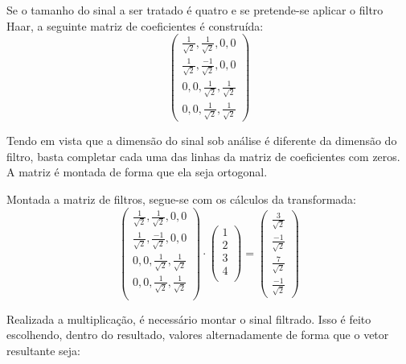 			\par Se o tamanho do sinal a ser tratado é quatro e se pretende-se aplicar o filtro Haar, a seguinte matriz de coeficientes é construída:
			\begin{equation}
				\begin{pmatrix}
					\frac{1}{\sqrt{2}}, \frac{1}{\sqrt{2}}, 0, 0\\
					\frac{1}{\sqrt{2}}, \frac{-1}{\sqrt{2}}, 0, 0\\
					0, 0, \frac{1}{\sqrt{2}}, \frac{1}{\sqrt{2}}\\
					0, 0, \frac{1}{\sqrt{2}}, \frac{1}{\sqrt{2}}
					\label{eq:haarFilters}
				\end{pmatrix} 
			\end{equation}
		
			\par Tendo em vista que a dimensão do sinal sob análise é diferente da dimensão do filtro, basta completar cada uma das linhas da matriz de coeficientes com zeros. A matriz é montada de forma que ela seja ortogonal.
			
			\par Montada a matriz de filtros, segue-se com os cálculos da transformada:
			\begin{equation}
				\begin{pmatrix}
					\frac{1}{\sqrt{2}}, \frac{1}{\sqrt{2}}, 0, 0\\
					\frac{1}{\sqrt{2}}, \frac{-1}{\sqrt{2}}, 0, 0\\
					0, 0, \frac{1}{\sqrt{2}}, \frac{1}{\sqrt{2}}\\
					0, 0, \frac{1}{\sqrt{2}}, \frac{1}{\sqrt{2}}\\
				\end{pmatrix} 
				\cdot
				\begin{pmatrix}
					1\\
					2\\
					3\\
					4\\
				\end{pmatrix} 
				=
				\begin{pmatrix}
					\frac{3}{\sqrt{2}}\\
					\frac{-1}{\sqrt{2}}\\
					\frac{7}{\sqrt{2}}\\
					\frac{-1}{\sqrt{2}}
				\end{pmatrix}
				\label{eq:haarMultiplic}
			\end{equation}

			\par Realizada a multiplicação, é necessário montar o sinal filtrado. Isso é feito escolhendo, dentro do resultado, valores alternadamente de forma que o vetor resultante seja:
			
